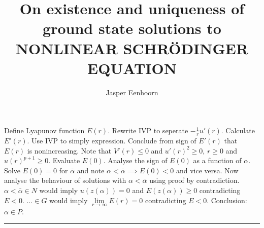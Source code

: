 \documentclass[11pt,a4paper]{amsart}
\title[]{On existence and uniqueness of ground state solutions to NONLINEAR SCHR\"ODINGER EQUATION}
\author[]{Jasper Eenhoorn}
\date{}
\theoremstyle{definition}
\numberwithin{equation}{section}
\renewcommand{\leq}{\leqslant}
\renewcommand{\geq}{\geqslant}
\def\seperate{\vspace{1em}\hrule\vspace{1em}}
\begin{document}
\begin{outline}
  \1 Define Lyapunov function $E(r)$.
  \1 Rewrite IVP to seperate $-\frac{1}{r}u'(r)$.
  \1 Calculate $E'(r)$.
  \1 Use IVP to simply expression.
  \1 Conclude from sign of $E'(r)$ that $E(r)$ is nonincreasing.
    \2 Note that $V'(r)\leq0$ and $u'(r)^2\geq0$, $r\geq0$ and $u(r)^{p+1}\geq0$.
  \1 Evaluate $E(0)$. Analyse the sign of $E(0)$ as a function of $\alpha$.
    \2 Solve $E(0)=0$ for $\bar\alpha$ and note $\alpha<\bar\alpha\implies E(0)<0$ and vice versa.
  \1 Now analyse the behaviour of solutions with $\alpha<\bar\alpha$ using proof by contradiction.
    \2 $\alpha<\bar\alpha\in N$ would imply $u(z(\alpha))=0$ and $E(z(\alpha))\geq0$ contradicting $E<0$.
    \2 $\ldots\in G$ would imply $\underset{r\to\infty}{\lim}E(r)=0$ contradicting $E<0$.
  \1 Conclusion: $\alpha\in P$.
\end{outline}
\seperate
\end{document}
